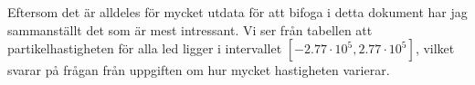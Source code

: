 \documentclass[a4paper]{article}
\begin{document}
Eftersom det är alldeles för mycket utdata för att bifoga i detta dokument har
jag sammanställt det som är mest intressant. Vi ser från tabellen att partikelhastigheten för alla led ligger i intervallet
$[-2.77 \cdot 10^5, 2.77 \cdot 10^5]$, vilket svarar på frågan från uppgiften om
hur mycket hastigheten varierar. 


\end{document}
